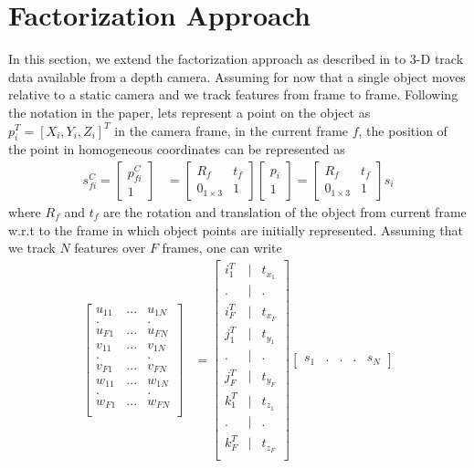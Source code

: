 \documentclass[conference]{IEEEtran}
\begin{document}
\section{Factorization Approach} In this section, we extend the factorization approach as described in \cite{costeira1998multibody} to 3-D track data available from a depth camera. Assuming for now that a single object moves relative to a static camera and we track features from frame to frame. Following the notation in the paper, lets represent a point on the object as $p_i^T = [X_i,Y_i,Z_i]^T$ in the camera frame, in the current frame $f$, the position of the point in homogeneous coordinates can be represented as 
\begin{align}
s_{fi}^C = \begin{bmatrix} 
p_{fi}^C\\1
\end{bmatrix}
&=\begin{bmatrix}
R_f & t_f\\
0_{1\times3}& 1
\end{bmatrix}
\begin{bmatrix}
p_i\\
1
\end{bmatrix}
= \begin{bmatrix}
R_f & t_f\\
0_{1\times3}& 1
\end{bmatrix}
s_i
\end{align}
where $R_f$ and $t_f$ are the rotation and translation of the object from current frame w.r.t to the frame in which object points are initially represented. Assuming that we track $N$ features over $F$ frames, one can write 
\begin{align}
\begin{bmatrix}
u_{11} & ... & u_{1N} \\ 
. &  & .\\
u_{F1} & ... & u_{FN} \\ 
v_{11} & ... & v_{1N} \\ 
. &  & .\\
v_{F1} & ... & v_{FN} \\ 
w_{11} & ... & w_{1N} \\ 
. &  & .\\
w_{F1} & ... & w_{FN} \\ 
\end{bmatrix} & = 
\begin{bmatrix}
i_1^T & | & t_{x_1}\\
. & | & .\\
i_F^T & | & t_{x_F}\\
j_1^T & | & t_{y_1}\\
. & | & .\\
j_F^T & | & t_{y_F}\\
k_1^T & | & t_{z_1}\\
. & | & .\\
k_F^T & | & t_{z_F}\\
\end{bmatrix}
\begin{bmatrix}
s_1 & . & . &. & s_N
\end{bmatrix}\label{eq:global_motion}
\end{align}
\end{document}
